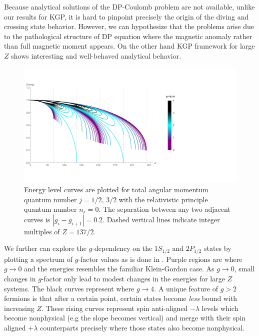 Because analytical solutions of the DP-Coulomb problem are not available, unlike our results for KGP, it is hard to pinpoint precisely the origin of the diving and crossing state behavior. However, we can hypothesize that the problems arise due to the pathological structure of DP equation where the magnetic anomaly rather than full magnetic moment appears. On the other hand KGP framework for large $Z$ shows interesting and well-behaved analytical behavior.

\begin{figure}[ht]
    \centering
    \includegraphics[clip, trim=0.0cm 0.0cm 8.0cm 0.0cm,width=0.90\linewidth]{plots/chap02moment/energy_spectrum.pdf}
     \caption{Energy level curves are plotted for total angular momentum quantum number $j=1/2,\,3/2$ with the relativistic principle quantum number $n_{r}=0$. The separation between any two adjacent curves is $|g_{i}-g_{i+1}|=0.2$. Dashed vertical lines indicate integer multiples of $Z=137/2$.}
    \label{fig:gspec3}
\end{figure}

We further can explore the $g$-dependency on the $1S_{1/2}$ and $2P_{1/2}$ states by plotting a spectrum of $g$-factor values as is done in . Purple regions are where $g\rightarrow0$ and the energies resembles the familiar Klein-Gordon case. As $g\to0$, small changes in $g$-factor only lead to modest changes in the energies for large $Z$ systems. The black curves represent where $g\rightarrow4$. A unique feature of $g>2$ fermions is that after a certain point, certain states become \emph{less} bound with increasing $Z$. These rising curves represent spin anti-aligned $-\lambda$ levels which become nonphysical (e.g the slope becomes vertical) and merge with their spin aligned $+\lambda$ counterparts precisely where those states also become nonphysical.

